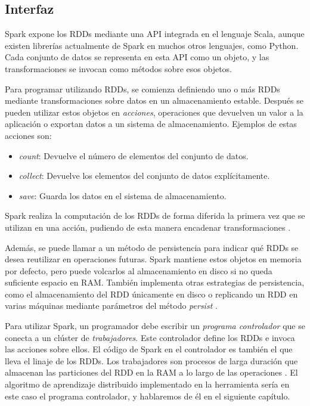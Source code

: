 \subsection{Interfaz}

Spark expone los RDDs mediante una API integrada en el lenguaje Scala, aunque existen librerías actualmente de Spark en
muchos otros lenguajes, como Python. Cada conjunto de datos se representa en esta API como un objeto, y las 
transformaciones se invocan como métodos sobre esos objetos.

\vspace{10pt}
Para programar utilizando RDDs, se comienza definiendo uno o más RDDs mediante transformaciones sobre datos en un
almacenamiento estable. Después se pueden utilizar estos objetos en \textit{acciones}, operaciones que devuelven un
valor a la aplicación o exportan datos a un sistema de almacenamiento. Ejemplos de estas acciones son:
\begin{itemize}
    \item \textit{count}: Devuelve el número de elementos del conjunto de datos.
    \item \textit{collect}: Devuelve los elementos del conjunto de datos explícitamente.
    \item \textit{save}: Guarda los datos en el sistema de almacenamiento.
\end{itemize}
Spark realiza la computación de los RDDs de forma diferida la primera vez que se utilizan en una acción, pudiendo de
esta manera encadenar transformaciones \cite{rdds}.

\vspace{10pt}
Además, se puede llamar a un método de persistencia para indicar qué RDDs se desea reutilizar en operaciones futuras.
Spark mantiene estos objetos en memoria por defecto, pero puede volcarlos al almacenamiento en disco si no queda
suficiente espacio en RAM. También implementa otras estrategias de persistencia, como el almacenamiento del RDD 
únicamente en disco o replicando un RDD en varias máquinas mediante parámetros del método \textit{persist} \cite{rdds}.

\vspace{10pt}
Para utilizar Spark, un programador debe escribir un \textit{programa controlador} que se conecta a un clúster de
\textit{trabajadores}. Este controlador define los RDDs e invoca las acciones sobre ellos. El código de Spark en el
controlador es también el que lleva el linaje de los RDDs. Los trabajadores son procesos de larga duración que 
almacenan las particiones del RDD en la RAM a lo largo de las operaciones \cite{rdds}. El algoritmo de aprendizaje
distribuido implementado en la herramienta sería en este caso el programa controlador, y hablaremos de él en el 
siguiente capítulo.

\endinput
